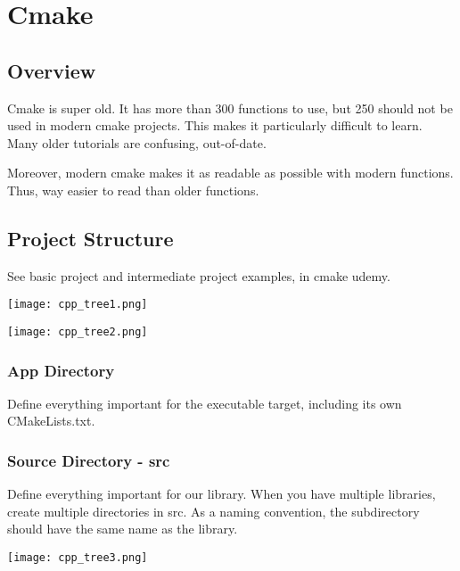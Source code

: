 \chapter{Cmake}

\section{Overview}

Cmake is super old. It has more than 300 functions to use, but 250 should not be used in modern cmake projects. 
This makes it particularly difficult to learn. Many older tutorials are confusing, out-of-date.

Moreover, modern cmake makes it as readable as possible with modern functions. Thus, way easier to read than older
functions.

\section{Project Structure}

See basic project and intermediate project examples, in cmake udemy.


\begin{center}
    \texttt{[image: cpp\_tree1.png]}
\end{center}


\begin{center}
    \texttt{[image: cpp\_tree2.png]}
\end{center}

\subsection{App Directory}

Define everything important for the executable target, including its own CMakeLists.txt.

\subsection{Source Directory - src}

Define everything important for our library. When you have multiple libraries, create multiple directories in
src. As a naming convention, the subdirectory should have the same name as the library.

\begin{center}
    \texttt{[image: cpp\_tree3.png]}
\end{center}

